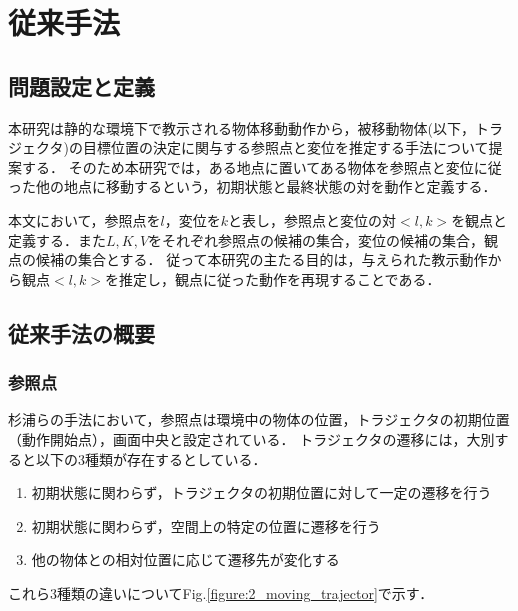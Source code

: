 ﻿%
\chapter{従来手法}

\section{問題設定と定義}

本研究は静的な環境下で教示される物体移動動作から，被移動物体(以下，トラジェクタ)の目標位置の決定に関与する参照点と変位を推定する手法について提案する．
そのため本研究では，ある地点に置いてある物体を参照点と変位に従った他の地点に移動するという，初期状態と最終状態の対を動作と定義する．

本文において，参照点を$l$，変位を$k$と表し，参照点と変位の対$<l , k>$を観点と定義する．また$L , K , V$をそれぞれ参照点の候補の集合，変位の候補の集合，観点の候補の集合とする．
従って本研究の主たる目的は，与えられた教示動作から観点$<l , k>$を推定し，観点に従った動作を再現することである．

\section{従来手法の概要}

\subsection{参照点}

杉浦ら\cite{sugiura}の手法において，参照点は環境中の物体の位置，トラジェクタの初期位置（動作開始点），画面中央と設定されている．
トラジェクタの遷移には，大別すると以下の3種類が存在するとしている．

	\begin{enumerate}
		\item 初期状態に関わらず，トラジェクタの初期位置に対して一定の遷移を行う
		\item 初期状態に関わらず，空間上の特定の位置に遷移を行う
		\item 他の物体との相対位置に応じて遷移先が変化する
	\end{enumerate}
これら3種類の違いについてFig.\ref{figure:2_moving_trajector}で示す．

